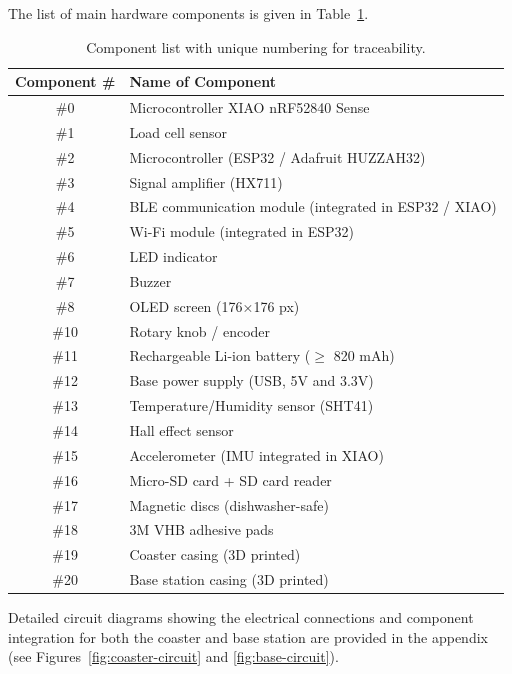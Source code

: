 \documentclass{article}
\begin{document}
The list of main hardware components is given in Table~\ref{tab:components}.

\begin{table}[H]
\centering
\renewcommand{\arraystretch}{1.2}
\setlength{\tabcolsep}{12pt}
\begin{tabular}{|c|p{9cm}|}
\hline
\rowcolor{blue!25}
\textbf{Component \#} & \textbf{Name of Component} \\
\hline
\#0  & Microcontroller XIAO nRF52840 Sense\\ \hline
\#1  & Load cell sensor \\ \hline
\#2  & Microcontroller (ESP32 / Adafruit HUZZAH32) \\ \hline
\#3  & Signal amplifier (HX711) \\ \hline
\#4  & BLE communication module (integrated in ESP32 / XIAO) \\ \hline
\#5  & Wi-Fi module (integrated in ESP32) \\ \hline
\#6  & LED indicator \\ \hline
\#7  & Buzzer \\ \hline
\#8  & OLED screen (176×176 px) \\ \hline
\#10 & Rotary knob / encoder \\ \hline
\#11 & Rechargeable Li-ion battery ($\geq$ 820 mAh) \\ \hline
\#12 & Base power supply (USB, 5V and 3.3V) \\ \hline
\#13 & Temperature/Humidity sensor (SHT41) \\ \hline
\#14 & Hall effect sensor \\ \hline
\#15 & Accelerometer (IMU integrated in XIAO) \\ \hline
\#16 & Micro-SD card + SD card reader \\ \hline
\#17 & Magnetic discs (dishwasher-safe) \\ \hline
\#18 & 3M VHB adhesive pads \\ \hline
\#19 & Coaster casing (3D printed) \\ \hline
\#20 & Base station casing (3D printed) \\ \hline
\end{tabular}
\caption{Component list with unique numbering for traceability.}
\label{tab:components}
\end{table}

Detailed circuit diagrams showing the electrical connections and component integration for both the coaster and base station are provided in the appendix (see Figures~\ref{fig:coaster-circuit} and \ref{fig:base-circuit}).\vspace{0.2cm}
\end{document}
